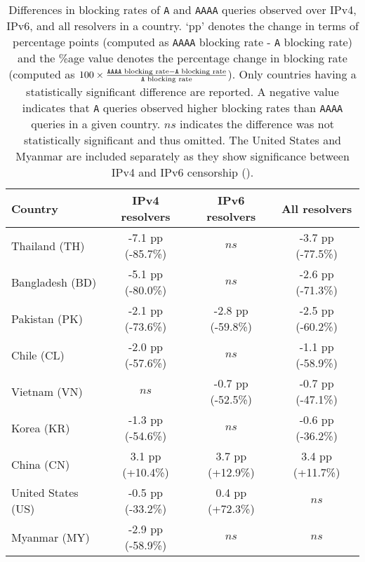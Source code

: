 \begin{table}[t]
  \centering
  \small
  \scalebox{\tabularscale} {
  \begin{tabular}{lccc}%
    \toprule
    {\bf Country}&{\bf IPv4 resolvers}&{\bf IPv6 resolvers} & {\bf All resolvers}
    \\ \midrule
    Thailand (TH)      & -7.1 pp (-85.7\%) & $ns$               & -3.7 pp (-77.5\%) \\
    Bangladesh (BD)    & -5.1 pp (-80.0\%) & $ns$               & -2.6 pp (-71.3\%) \\
    Pakistan (PK)      & -2.1 pp (-73.6\%) & -2.8 pp (-59.8\%)  & -2.5 pp (-60.2\%) \\
    Chile (CL)         & -2.0 pp (-57.6\%) & $ns$               & -1.1 pp (-58.9\%) \\
    Vietnam (VN)       & $ns$              & -0.7 pp (-52.5\%)  & -0.7 pp (-47.1\%) \\
    Korea (KR)         & -1.3 pp (-54.6\%) & $ns$               & -0.6 pp (-36.2\%) \\
    China (CN)         &  3.1 pp (+10.4\%) &  3.7 pp (+12.9\%)  &  3.4 pp (+11.7\%) \\
    \midrule
    United States (US) & -0.5 pp (-33.2\%) &  0.4 pp (+72.3\%)  &  $ns$  \\
    Myanmar (MY)       & -2.9 pp (-58.9\%) & $ns$    &  $ns$  \\
    \bottomrule
  \end{tabular}
  }
  \caption{Differences in blocking rates of {\tt A} and {\tt AAAA} queries
  observed over IPv4, IPv6, and all resolvers in a country. `pp' denotes the
  change in terms of percentage points (computed as {\tt AAAA} blocking rate
  - {\tt A} blocking rate) and the \%age value denotes the percentage change in
  blocking rate (computed as
  $
  100\times\frac{\text{{\tt AAAA} blocking rate} - \text{{\tt A} blocking rate}}
  {\text{{\tt A} blocking rate}}
  $). 
  Only countries having a statistically significant difference are reported. A
  negative value indicates that {\tt A} queries observed higher blocking rates
  than {\tt AAAA} queries in a given country. $ns$ indicates the difference was
  not statistically significant and thus omitted. The United States and Myanmar
  are included separately as they show significance between IPv4 and IPv6
  censorship ().}
  \label{tab:resources:countries}
\end{table}

